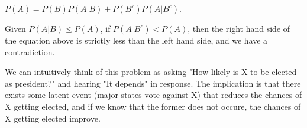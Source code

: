 $P(A) = P(B)P(A|B) + P(B^{c})P(A|B^{c})$.

Given $P(A|B) \leq P(A)$, if $P(A|B^{c}) < P(A)$, then the right hand side of the equation above is strictly less than the left hand side, and we have a contradiction.

We can intuitively think of this problem as asking "How likely is X to be elected as president?" and hearing "It depends" in response. The implication is that there exists some latent event (major states vote against X) that reduces the chances of X getting elected, and if we know that the former does not occure, the chances of X getting elected improve.